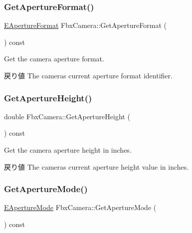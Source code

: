 \subsubsection{\texorpdfstring{Get\+Aperture\+Format()}{GetApertureFormat()}}
{\footnotesize\ttfamily \hyperlink{class_fbx_camera_ac26ac89602453c5917882c69d4863d13}{E\+Aperture\+Format} Fbx\+Camera\+::\+Get\+Aperture\+Format (\begin{DoxyParamCaption}{ }\end{DoxyParamCaption}) const}

Get the camera aperture format. \begin{DoxyReturn}{戻り値}
The camera\textquotesingle{}s current aperture format identifier. 
\end{DoxyReturn}
\mbox{\label{class_fbx_camera_a652045fde3804f8a66b696030e40f662}} 
\subsubsection{\texorpdfstring{Get\+Aperture\+Height()}{GetApertureHeight()}}
{\footnotesize\ttfamily double Fbx\+Camera\+::\+Get\+Aperture\+Height (\begin{DoxyParamCaption}{ }\end{DoxyParamCaption}) const}

Get the camera aperture height in inches. \begin{DoxyReturn}{戻り値}
The camera\textquotesingle{}s current aperture height value in inches. 
\end{DoxyReturn}
\mbox{\label{class_fbx_camera_a3dea5cf232d8faafbc4c5a720fde419c}} 
\subsubsection{\texorpdfstring{Get\+Aperture\+Mode()}{GetApertureMode()}}
{\footnotesize\ttfamily \hyperlink{class_fbx_camera_addeea6fc943ce5f087dbc54c142f890e}{E\+Aperture\+Mode} Fbx\+Camera\+::\+Get\+Aperture\+Mode (\begin{DoxyParamCaption}{ }\end{DoxyParamCaption}) const}


